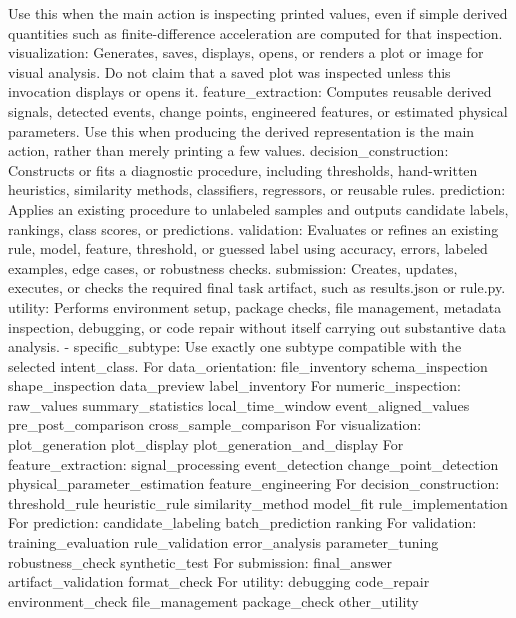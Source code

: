 \documentclass[11pt]{article}
\begin{document}
\begin{DocCode}
    Use this when the main action is inspecting printed values, even if simple derived quantities such as finite-difference acceleration are computed for that inspection.
  visualization:
    Generates, saves, displays, opens, or renders a plot or image for visual analysis.
    Do not claim that a saved plot was inspected unless this invocation displays or opens it.
  feature_extraction:
    Computes reusable derived signals, detected events, change points, engineered features, or estimated physical parameters.
    Use this when producing the derived representation is the main action, rather than merely printing a few values.
  decision_construction:
    Constructs or fits a diagnostic procedure, including thresholds, hand-written heuristics, similarity methods, classifiers, regressors, or reusable rules.
  prediction:
    Applies an existing procedure to unlabeled samples and outputs candidate labels, rankings, class scores, or predictions.
  validation:
    Evaluates or refines an existing rule, model, feature, threshold, or guessed label
    using accuracy, errors, labeled examples, edge cases, or robustness checks.
  submission:
    Creates, updates, executes, or checks the required final task artifact, such as
    results.json or rule.py.
  utility:
    Performs environment setup, package checks, file management, metadata inspection,
    debugging, or code repair without itself carrying out substantive data analysis.
- specific_subtype:
  Use exactly one subtype compatible with the selected intent_class.
  For data_orientation:
    file_inventory
    schema_inspection
    shape_inspection
    data_preview
    label_inventory
  For numeric_inspection:
    raw_values
    summary_statistics
    local_time_window
    event_aligned_values
    pre_post_comparison
    cross_sample_comparison
  For visualization:
    plot_generation
    plot_display
    plot_generation_and_display
  For feature_extraction:
    signal_processing
    event_detection
    change_point_detection
    physical_parameter_estimation
    feature_engineering
  For decision_construction:
    threshold_rule
    heuristic_rule
    similarity_method
    model_fit
    rule_implementation
  For prediction:
    candidate_labeling
    batch_prediction
    ranking
  For validation:
    training_evaluation
    rule_validation
    error_analysis
    parameter_tuning
    robustness_check
    synthetic_test
  For submission:
    final_answer
    artifact_validation
    format_check
  For utility:
    debugging
    code_repair
    environment_check
    file_management
    package_check
    other_utility

\end{DocCode}
\end{document}

